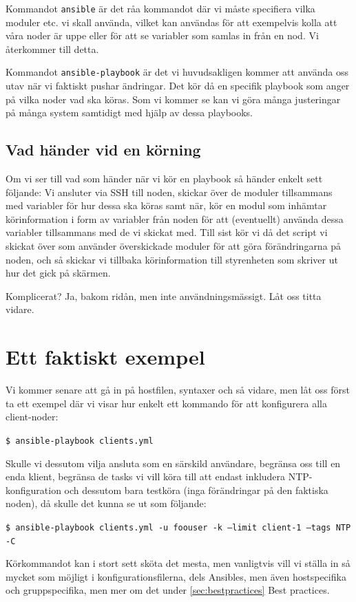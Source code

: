 Kommandot \texttt{ansible} är det råa kommandot där vi måste specifiera vilka moduler etc. vi skall använda, vilket kan användas för att exempelvis kolla att våra noder är uppe eller för att se variabler som samlas in från en nod. Vi återkommer till detta.

Kommandot \texttt{ansible-playbook} är det vi huvudsakligen kommer att använda oss utav när vi faktiskt pushar ändringar. Det kör då en specifik playbook som anger på vilka noder vad ska köras. Som vi kommer se kan vi göra många justeringar på många system samtidigt med hjälp av dessa playbooks.

\subsection{Vad händer vid en körning}
Om vi ser till vad som händer när vi kör en playbook så händer enkelt sett följande:
Vi ansluter via SSH till noden, skickar över de moduler tillsammans med variabler för hur dessa ska köras samt när, kör en modul som inhämtar körinformation i form av variabler från noden för att (eventuellt) använda dessa variabler tillsammans med de vi skickat med. Till sist kör vi då det script vi skickat över som använder överskickade moduler för att göra förändringarna på noden, och så skickar vi tillbaka körinformation till styrenheten som skriver ut hur det gick på skärmen.

Komplicerat? Ja, bakom ridån, men inte användningsmässigt. Låt oss titta vidare.

\section{Ett faktiskt exempel}
Vi kommer senare att gå in på hostfilen, syntaxer och så vidare, men låt oss först ta ett exempel där vi visar hur enkelt ett kommando för att konfigurera alla client-noder:

\texttt{\$ ansible-playbook clients.yml}

Skulle vi dessutom vilja ansluta som en särskild användare, begränsa oss till en enda klient, begränsa de tasks vi 
vill köra till att endast inkludera NTP-konfiguration och dessutom bara testköra (inga förändringar på den faktiska 
noden), då skulle det kunna se ut som följande:

\texttt{\$ ansible-playbook clients.yml -u foouser -k --limit client-1 --tags NTP -C}

Körkommandot kan i stort sett sköta det mesta, men vanligtvis vill vi ställa in så mycket som möjligt i konfigurationsfilerna, dels Ansibles, men även hostspecifika och gruppspecifika, men mer om det under \ref{sec:bestpractices} Best practices.

